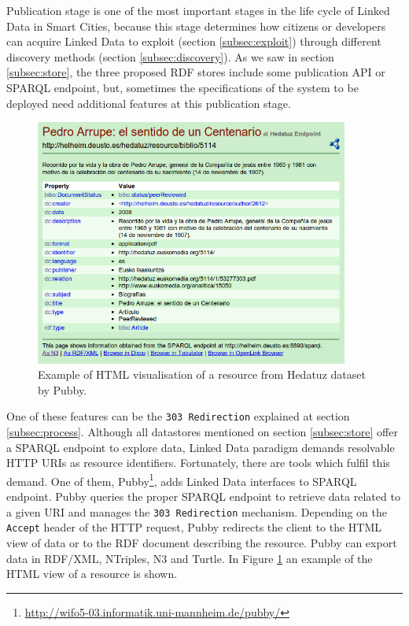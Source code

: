 Publication stage is one of the most important stages in the life cycle of Linked Data in Smart Cities, because this stage determines how citizens or developers can acquire Linked Data to exploit (section \ref{subsec:exploit}) through different discovery methods (section \ref{subsec:discovery}). As we saw in section \ref{subsec:store}, the three proposed RDF stores include some publication API or SPARQL endpoint, but, sometimes the specifications of the system to be deployed need additional features at this publication stage.

\begin{figure}
    \center
    \includegraphics[width=0.92\textwidth]{img/ld_approach/pubby.png}
    \caption{Example of HTML visualisation of a resource from Hedatuz dataset by Pubby.}
    \label{fig:pubby}
\end{figure}

One of these features can be the \texttt{303 Redirection} explained at section \ref{subsec:process}. Although all datastores mentioned on section \ref{subsec:store} offer a SPARQL endpoint to explore data, Linked Data paradigm demands resolvable HTTP URIs as resource identifiers. Fortunately, there are tools which fulfil this demand. One of them, Pubby\footnote{\url{http://wifo5-03.informatik.uni-mannheim.de/pubby/}}, adds Linked Data interfaces to SPARQL endpoint. Pubby queries the proper SPARQL endpoint to retrieve data related to a given URI and manages the \texttt{303 Redirection} mechanism. Depending on the \texttt{Accept} header of the HTTP request, Pubby redirects the client to the HTML view of data or to the RDF document describing the resource. Pubby can export data in RDF/XML, NTriples, N3 and Turtle. In Figure \ref{fig:pubby} an example of the HTML view of a resource is shown.

